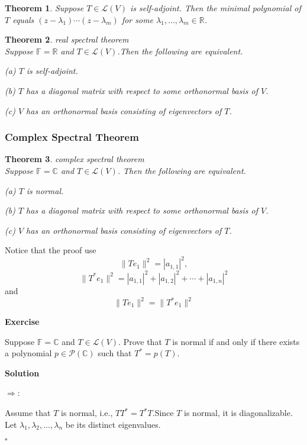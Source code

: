 \documentclass{article}
\newtheorem{theorem}{Theorem}[subsection]
\newenvironment{exercise}{%
{\textbf{Exercise\\}
    }
}{
}
\newenvironment{solution}{%
{
    \textbf{Solution\\}
    }
}{
  \hfill $\square$ 
  \par\bigskip 
}
\newcommand{\RR}{\mathbb{R}}
\newcommand{\CC}{\mathbb{C}}
\newcommand{\FF}{\mathbb{F}}
\begin{document}
\begin{CJK}{UTF8}{gkai}
\begin{theorem}
    Suppose $T \in \mathcal{L}(V)$ is self-adjoint. Then the minimal polynomial of $T$ equals
    $(z - \lambda_1)\cdots(z- \lambda_m)$ for some $\lambda_1,\ldots, \lambda_m \in \RR$.
\end{theorem}

\begin{theorem}
    real spectral theorem\\

    Suppose $\FF=\RR$ and $T\in\mathcal{L}(V)$.Then the following are equivalent.
    
    (a) $T$ is self-adjoint.

    (b) $T$ has a diagonal matrix with respect to some orthonormal basis of $V$.

    (c) $V$ has an orthonormal basis consisting of eigenvectors of $T$.
\end{theorem}

\subsubsection{Complex Spectral Theorem}

\begin{theorem}
    complex spectral theorem\\

    Suppose $\FF = \CC$ and $T \in \mathcal{L}(V)$. Then the following are equivalent.

    (a) $T$ is normal.

    (b) $T$ has a diagonal matrix with respect to some orthonormal basis of $V$.

    (c) $V$ has an orthonormal basis consisting of eigenvectors of $T$.
\end{theorem}

Notice that the proof use 
\[\|Te_1\|^2 = |a_{1,1}|^2,
\]
\[\|T^\ast e_1\|^2 = |a_{1,1}|^2 + |a_{1,2}|^2 + \cdots + |a_{1,n}|^2\]
and
\[\|Te_1\|^2 = \|T^\ast e_1\|^2\]

\begin{exercise}
    Suppose $\FF = \CC$ and $T \in \mathcal{L}(V)$. Prove that $T$ is normal if and only if there exists a polynomial $p \in  \mathcal{P}(\CC)$ such that $T^\ast = p(T)$.    
\end{exercise}

\begin{solution}
    $\Rightarrow$:

    Assume that $T$ is normal, i.e., $TT^\ast = T^\ast T$.Since $T$ is normal, it is diagonalizable. Let $\lambda_1, \lambda_2, \ldots, \lambda_n$ be its distinct eigenvalues.


\end{solution}
\end{CJK}
\end{document}
